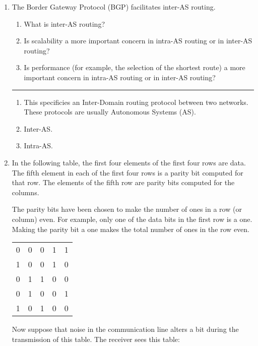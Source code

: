 \documentclass[twoside]{article}
\newenvironment{answer}
  {\vspace*{0.2cm} \rule{12cm}{0.04cm} \vspace*{0.2cm}}
  {\vspace*{0.2cm}}
\begin{document}
\begin{enumerate}
\begin{answer}
    \end{answer}

  \item The Border Gateway Protocol (BGP) facilitates inter-AS routing.
  \begin{enumerate}
    \item What is inter-AS routing?
    \item Is scalability a more important concern in intra-AS routing
      or in inter-AS routing?
    \item Is performance (for example, the selection of the shortest
      route) a more important concern in intra-AS routing or
      in inter-AS routing?
    \end{enumerate}

  \begin{answer}

  \begin{enumerate}
    \item This specificies an Inter-Domain routing protocol between two networks.  These protocols are usually Autonomous Systems (AS).
    \item Inter-AS.
    \item Intra-AS.
    \end{enumerate}

    \end{answer}

  \item In the following table, the first four elements of the
    first four rows are data. The fifth element in each of the 
    first four rows is a parity bit computed for that row.
    The elements of the fifth row are parity bits computed
    for the columns.

    The parity bits have been chosen to make the number of
    ones in a row (or column) even.
    For example, only one of the data bits in the first row
    is a one. Making the parity bit a one makes the total
    number of ones in the row even.

  \begin{tabular}{llll|l}
    0 & 0 & 0 & 1 & 1 \\
    1 & 0 & 0 & 1 & 0 \\
    0 & 1 & 1 & 0 & 0 \\
    0 & 1 & 0 & 0 & 1 \\ \hline
    1 & 0 & 1 & 0 & 0
    \end{tabular}

    Now suppose that noise in the communication line
    alters a bit during the transmission of this table.
    The receiver sees this table:


\end{enumerate}
\end{document}
